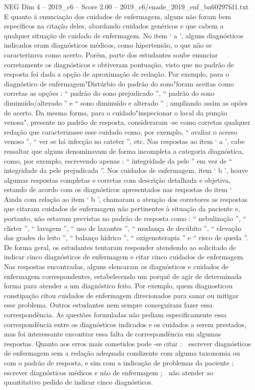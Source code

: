 \begin{textsample}{NEG Dim 4 – 2019\_c6 – Score 2.00 – 2019\_c6/enade\_2019\_enf\_ba60297fd1.txt}
E quanto à enunciação dos cuidados de enfermagem, alguns não foram bem específicos na citação deles, abordando cuidados genéricos e que cabem a qualquer situação de cuidado de enfermagem.
No item ‘ a ’, alguns diagnósticos indicados eram diagnósticos médicos, como hipertensão, o que não se caracterizava como acerto.
Porém, parte dos estudantes soube enunciar corretamente os diagnósticos e obtiveram pontuação, visto que no padrão de resposta foi dada a opção de aproximação de redação.
Por exemplo, para o diagnóstico de enfermagem"Distúrbio do padrão do sono"foram aceitas como corretas as opções : “ padrão do sono prejudicado ”, “ padrão do sono diminuído/alterado ” e “ sono diminuído e alterado ” ; ampliando assim as opões de acerto.
Da mesma forma, para o cuidado"inspecionar o local da punção venosa", presente no padrão de resposta, consideraram -se como corretas qualquer redação que caracterizasse esse cuidado como, por exemplo, “ avaliar o acesso venoso ”, “ ver se há infecção no cateter ”, etc.
Nas respostas ao item ‘ a ’, cabe ressaltar que alguns denominavam de forma incompleta a categoria diagnóstica, como, por exemplo, escrevendo apenas : “ integridade da pele ” em vez de “ integridade da pele prejudicada ”.
Nos cuidados de enfermagem, item ‘ b ’, houve algumas respostas completas e corretas com descrição detalhada e objetiva, estando de acordo com os diagnósticos apresentados nas respostas do item ‘ Ainda com relação ao item ‘ b ’, chamaram a atenção dos corretores as respostas que citaram cuidados de enfermagem não pertinentes à situação da paciente e, portanto, não estavam previstas no padrão de resposta como : “ nebulização ”, “ clister ”, “ lavagem ”, “ uso de laxantes ”, “ mudança de decúbito ”, “ elevação das grades do leito ”, “ balanço hídrico ”, “ oxigenoterapia ” e “ risco de queda ”.
De forma geral, os estudantes tentaram responder atendendo ao solicitado de indicar cinco diagnósticos de enfermagem e citar cinco cuidados de enfermagem.
Nas respostas encontradas, alguns elencaram os diagnósticos e cuidados de enfermagem correspondentes, estabelecendo um porquê de agir de determinada forma para atender a um diagnóstico feito.
Por exemplo, quem diagnosticou constipação citou cuidados de enfermagem direcionados para sanar ou mitigar esse problema.
Outros estudantes nem sempre conseguiram fazer essa correspondência.
As questões formuladas não pediam especificamente essa correspondência entre os diagnósticos indicados e os cuidados a serem prestados, mas foi interessante encontrar essa falta de correspondência em algumas respostas.
Quanto aos erros mais cometidos pode -se citar :  escrever diagnósticos de enfermagem sem a redação adequada condizente com alguma taxonomia ou com o padrão de resposta, e sim com a indicação de problemas da paciente ;  escrever diagnósticos médicos e não de enfermagem ;  não atender ao quantitativo pedido de indicar cinco diagnósticos.

\end{textsample}
